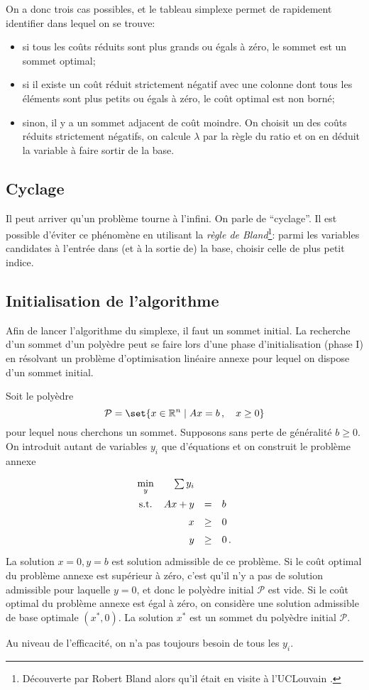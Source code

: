 On a donc trois cas possibles,
et le tableau simplexe permet de rapidement identifier
dans lequel on se trouve:
\begin{itemize}
	\item si tous les coûts réduits sont plus grands ou égals à zéro,
	le sommet est un sommet optimal;
	\item si il existe un coût réduit strictement négatif
	avec une colonne dont tous les éléments sont
	plus petits ou égals à zéro,
	le coût optimal est non borné;
	\item sinon, il y a un sommet adjacent de coût moindre.
	On choisit un des coûts réduits strictement négatifs,
	on calcule $\lambda$ par la règle du ratio
	et on en déduit la variable à faire sortir de la base.
\end{itemize}

\subsection{Cyclage}

Il peut arriver qu'un problème tourne à l'infini.
On parle de ``cyclage''.
Il est possible d'éviter ce phénomène
en utilisant la \emph{règle de Bland}\footnote{Découverte par Robert Bland
alors qu'il était en visite à l'UCLouvain \dSmiley.}:
parmi les variables candidates à l’entrée dans (et à la sortie de) la base,
choisir celle de plus petit indice.

\subsection{Initialisation de l'algorithme}

Afin de lancer l'algorithme du simplexe,
il faut un sommet initial.
La recherche d'un sommet d'un polyèdre peut se faire
lors d'une phase d'initialisation (phase I)
en résolvant un problème d'optimisation linéaire annexe
pour lequel on dispose d'un sommet initial.

Soit le polyèdre
\[
\mathcal{P} = \set{x \in \Rn \suchthat Ax = b\,,\quad x \ge 0}
\]
pour lequel nous cherchons un sommet.
Supposons sans perte de généralité $b \ge 0$.
On introduit autant de variables $y_i$ que d'équations
et on construit le problème annexe
\[
\renewcommand{\arraystretch}{1.5}
\begin{array}{c@{\quad}rcl}
	\min\limits_{y} & \sum y_i &&\\
	\textnormal{s.t.} & Ax + y & = & b\\
	& x & \ge & 0\\
	& y & \ge & 0\,.
\end{array}
\]
La solution $x = 0, y = b$ est solution admissible de ce problème.
Si le coût optimal du problème annexe
est supérieur à zéro,
c’est qu’il n’y a pas de solution admissible pour laquelle $y = 0$,
et donc le polyèdre initial $\mathcal{P}$ est vide.
Si le coût optimal du problème annexe est égal à zéro,
on considère une solution admissible de base optimale $(x^*,0)$.
La solution $x^*$ est un sommet du polyèdre initial $\mathcal{P}$.

Au niveau de l'efficacité,
on n'a pas toujours besoin de tous les $y_i$.
